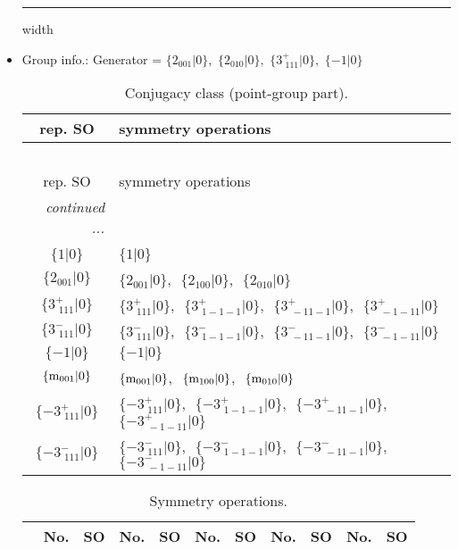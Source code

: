 \documentclass[fleqn,10pt,landscape]{article}
\begin{document}
\begin{itemize}
 \hfil \hrule height 1mm width \textwidth \hfil

\item Group info.: Generator = $\{2{}_{001}|0\},\,\,\{2{}_{010}|0\},\,\,\{3^{+}_{\,\,111}|0\},\,\,\{-1|0\}$

\begin{center}
\renewcommand{\arraystretch}{1.3}
\begin{longtable}{c|l}
\caption{Conjugacy class (point-group part).}
 \\
 \hline \hline
rep. SO & symmetry operations \\ \hline \endfirsthead

\multicolumn{1}{l}{\tablename\ \thetable{}} \\
 \hline \hline
rep. SO & symmetry operations \\ \hline \endhead

 \hline \hline
\multicolumn{1}{r}{\footnotesize\it continued ...} \\ \endfoot

 \hline \hline
\multicolumn{1}{r}{} \\ \endlastfoot

$\{1|0\}$ & $\{1|0\}$ \\ \hline
$\{2{}_{001}|0\}$ & $\{2{}_{001}|0\}$,\,\, $\{2{}_{100}|0\}$,\,\, $\{2{}_{010}|0\}$ \\ \hline
$\{3^{+}_{\,\,111}|0\}$ & $\{3^{+}_{\,\,111}|0\}$,\,\, $\{3^{+}_{\,\,1-1-1}|0\}$,\,\, $\{3^{+}_{\,\,-11-1}|0\}$,\,\, $\{3^{+}_{\,\,-1-11}|0\}$ \\ \hline
$\{3^{-}_{\,\,111}|0\}$ & $\{3^{-}_{\,\,111}|0\}$,\,\, $\{3^{-}_{\,\,1-1-1}|0\}$,\,\, $\{3^{-}_{\,\,-11-1}|0\}$,\,\, $\{3^{-}_{\,\,-1-11}|0\}$ \\ \hline
$\{-1|0\}$ & $\{-1|0\}$ \\ \hline
$\{{\rm m}_{001}|0\}$ & $\{{\rm m}_{001}|0\}$,\,\, $\{{\rm m}_{100}|0\}$,\,\, $\{{\rm m}_{010}|0\}$ \\ \hline
$\{-3^{+}_{\,\,111}|0\}$ & $\{-3^{+}_{\,\,111}|0\}$,\,\, $\{-3^{+}_{\,\,1-1-1}|0\}$,\,\, $\{-3^{+}_{\,\,-11-1}|0\}$,\,\, $\{-3^{+}_{\,\,-1-11}|0\}$ \\ \hline
$\{-3^{-}_{\,\,111}|0\}$ & $\{-3^{-}_{\,\,111}|0\}$,\,\, $\{-3^{-}_{\,\,1-1-1}|0\}$,\,\, $\{-3^{-}_{\,\,-11-1}|0\}$,\,\, $\{-3^{-}_{\,\,-1-11}|0\}$ \\
\end{longtable}
\end{center}
\begin{center}
\renewcommand{\arraystretch}{1.3}
\begin{longtable}{c|cc|cc|cc|cc|cc}
\caption{Symmetry operations.}
 \\
 \hline \hline
 & No. & SO & No. & SO & No. & SO & No. & SO & No. & SO \\ \hline \endfirsthead


\end{longtable}
\end{center}
\end{itemize}
\end{document}
